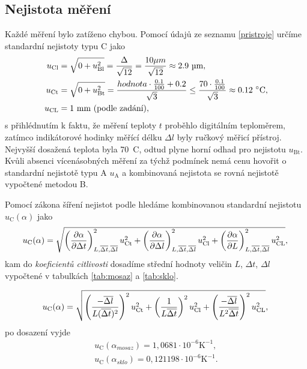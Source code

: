 \documentclass[a4paper,12pt]{article}   %
\begin{document}
\subsection{Nejistota měření}
Každé měření bylo zatíženo chybou. Pomocí údajů ze seznamu \ref{pristroje} určíme standardní nejistoty typu C jako
\begin{equation}
  \begin{split}
    u_{\text{Cl}} &= \sqrt{0 + u^2_{\text{Bl}}} = \frac{\Delta}{\sqrt{12}} = \frac{10 \mu m}{\sqrt{12}} \approx 2.9~\text{\textmu m},\\
    u_{\text{Ct}} &= \sqrt{0 + u^2_{\text{Bt}}} =\frac{hodnota \cdot \frac{0.1}{100}+0.2}{\sqrt{3}} \le \frac{70 \cdot \frac{0.1}{100}}{\sqrt{3}} \approx 0.12 ~\degree \text{C},\\
    u_{\text{CL}} &= 1~\text{mm (podle zadání)},\\
    \label{eq:nejistoty}
  \end{split}
\end{equation}
s přihlédnutím k faktu, že měření teploty $t$ proběhlo digitálním teploměrem, zatímco indikátorové hodinky měřící délku $\Delta l$ byly ručkový měřicí přístroj. Nejvyšší dosažená teplota byla 70~\degree C, odtud plyne horní odhad pro nejistotu $u_\text{Bt}$. Kvůli absenci vícenásobných měření za týchž podmínek nemá cenu hovořit o standardní nejistotě typu A $u_\text{A}$ a kombinovaná nejistota se rovná nejistotě vypočtené metodou B.

Pomocí zákona šíření nejistot podle \cite{url:konicek} hledáme kombinovanou standardní nejistotu $u_\text{C}(\alpha)$ jako
\begin{equation}
    u_\text{C}(\alpha) = \sqrt{\left(\frac{\partial \alpha}{\partial \Delta t}\right)_{L, \overline{\Delta t}, \overline{\Delta l}}^2u^2_{\text{Ct}}+\left(\frac{\partial \alpha}{\partial \Delta l}\right)_{L, \overline{\Delta t}, \overline{\Delta l}}^2u^2_{\text{Cl}}+\left(\frac{\partial \alpha}{\partial L}\right)_{L, \overline{\Delta t}, \overline{\Delta l}}^2u^2_{\text{CL}}},\\
    \label{eq:nejistotamain}
  \end{equation}
  kam do \textit{koeficientů citlivosti} dosadíme střední hodnoty veličin $L$, $\Delta t$, $\Delta l$ vypočtené v tabulkách \ref{tab:mosaz} a \ref{tab:sklo}.


  \begin{equation}
    u_\text{C}(\alpha) = \sqrt{\left(\frac{- \overline{\Delta l}}{L (\overline{\Delta t})^2}\right)^2u^2_{\text{Ct}}
    +\left(\frac{1}{L\overline{\Delta t}}\right)^2u^2_{\text{Cl}}
    +\left(\frac{- \overline{\Delta l}}{L^2 \overline{\Delta t}}\right)^2u^2_{\text{CL}}},\\
  \end{equation}
  po dosazení vyjde 
  \begin{equation}
    \begin{split}
      u_\text{C}(\alpha_{mosaz}) = 1,0681 \cdot 10^{-6}\text{K}^{-1}\text{,} \\
      u_\text{C}(\alpha_{sklo}) = 0,121198 \cdot 10^{-6}\text{K}^{-1}\text{.}
    \end{split}
  \end{equation}
\end{document}
